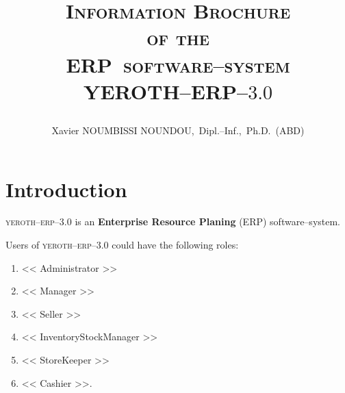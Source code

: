 \documentclass[a4paper, 10pt, twocolumn]{article}
\newcommand{\pos}{ERP~software--system\xspace}
\newcommand{\yerenpos}{\textcolor{yerenColorBlue}{\sc YEROTH--ERP--$3.0$}\xspace}
\newcommand{\myfullacademicname}{Xavier NOUMBISSI NOUNDOU,~Dipl.--Inf.,~Ph.D.~(ABD)\xspace}
\newcommand{\yeren}{\textsc{yeroth--erp--3.0}\xspace}
\newcommand{\administrator}{<< Administrator >>\xspace}
\newcommand{\manager}{<< Manager >>\xspace}
\newcommand{\seller}{<< Seller >>\xspace}
\newcommand{\inventorystockmanager}{<< InventoryStockManager >>\xspace}
\newcommand{\storekeeper}{<< StoreKeeper >>\xspace}
\newcommand{\cashier}{<< Cashier >>\xspace}
\begin{document}
\title{\textcolor{medgreen}{
\vspace{0em}
\textsc{Information Brochure \\
of the \\
\pos \\ \vspace{1em}
\yerenpos}}
\author{\myfullacademicname}
}

\date{} 
\maketitle
\thispagestyle{fancy}



\vspace{-1.9em}
\section{Introduction}
\vspace{-0.9em}
\yeren is an \textbf{Enterprise Resource Planing} (ERP)
software--system. 

Users of \yeren could have the following roles:
\begin{enumerate}[1)]
	\itemsep -0.6em
	\item \administrator
	\item \manager
	\item \seller
	\item \inventorystockmanager
	\item \storekeeper
	\item \cashier.	
\end{enumerate}
\end{document}

